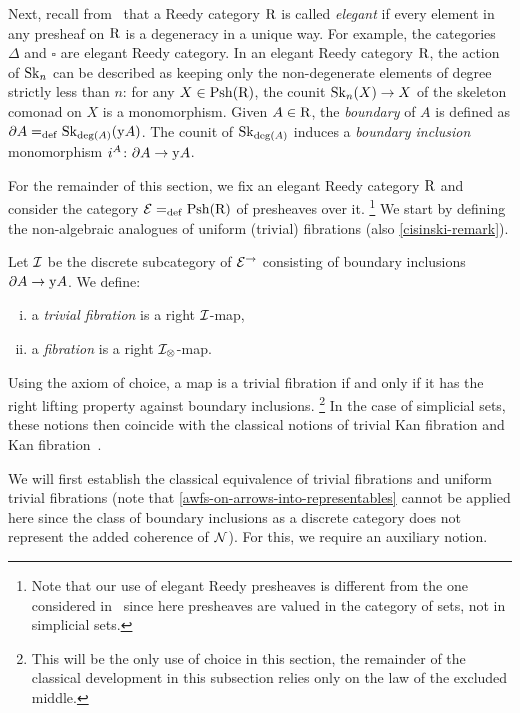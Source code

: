 \documentclass[reqno,10pt,a4paper,oneside,draft]{amsart}
\begin{document}
Next, recall from~\cite{bergner-rezk-elegant} that a Reedy category $\R$ is called \emph{elegant} if every element in any presheaf on $\R$ is a degeneracy in a unique way.
For example, the categories $\Delta$ and $\square$ are elegant Reedy category.
In an elegant Reedy category $\R$, the action of $\Sk_n$ can be described as keeping only the non-degenerate elements of degree strictly less than $n$: for any $X \in \Psh(\R)$, the counit $\Sk_n(X) \to X$ of the skeleton comonad on $X$ is a monomorphism.
Given $A \in \R$, the \emph{boundary} of $A$ is defined as $\partial A \defeq \Sk_{\deg(A)}(\yon A)$.
The counit of $\Sk_{\deg(A)}$ induces a \emph{boundary inclusion} monomorphism $i^A \co \partial A \to \yon A$.

\medskip

For the remainder of this section, we fix an elegant Reedy category $\R$ and consider the category $\calE \defeq \Rhat$ of presheaves over it.%
\footnote{Note that our use of elegant Reedy presheaves is different from the one considered in~\cite{shulman:reedy} since here presheaves are valued in the category of sets, not in simplicial sets.}
We start by defining the non-algebraic analogues of uniform (trivial) fibrations (\cf also \cref{cisinski-remark}).

\begin{definition}
Let $\cal{I}$ be the discrete subcategory of $\catE^{\to}$ consisting of boundary inclusions $\partial A \to \yon A$.
We define:
\begin{enumerate}[(i)]
\item a \emph{trivial fibration} is a right $\cal{I}$-map,
\item a \emph{fibration} is a right $\cal{I}_\otimes$-map.
\end{enumerate}
\end{definition}

Using the axiom of choice, a map is a trivial fibration if and only if it has the right lifting property against boundary inclusions.%
\footnote{This will be the only use of choice in this section, the remainder of the classical development in this subsection relies only on the law of the excluded middle.}
In the case of simplicial sets, these notions then coincide with the classical notions of trivial Kan fibration and Kan fibration~\cite[Chap.~IV, Sec.~2]{gabriel-zisman:calculus-of-fractions}.

\medskip

We will first establish the classical equivalence of trivial fibrations and uniform trivial fibrations (note that \cref{awfs-on-arrows-into-representables} cannot be applied here since the class of boundary inclusions as a discrete category does not represent the added coherence of $\cal{N}$).
For this, we require an auxiliary notion.
\end{document}

